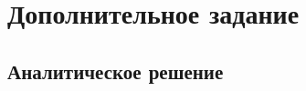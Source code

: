 \documentclass[12pt]{article}
\begin{document}
	\section{Дополнительное задание}
	
	\subsection{Аналитическое решение}
	
	\begin{figure}[h]
	\end{figure}
	\begin{figure}[h]
\end{figure}
\end{document}
